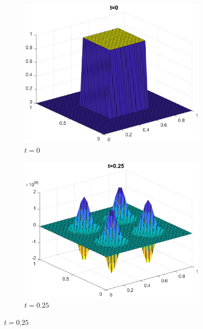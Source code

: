 \documentclass[]{article}
\begin{document}
\begin{figure}[htbp]
		\begin{subfigure}[b]{0.45\textwidth}
			\includegraphics[width=\textwidth]{images/h1_t0.eps}
			\caption{$t = 0$}
			\label{fig:image1}
		\end{subfigure}
		\hfill
		\begin{subfigure}[b]{0.45\textwidth}
			\includegraphics[width=\textwidth]{images/h1_t1.eps}
			\caption{$t = 0.25$}
			\label{fig:image2}
		\end{subfigure}
		
	\end{figure}
\end{document}
